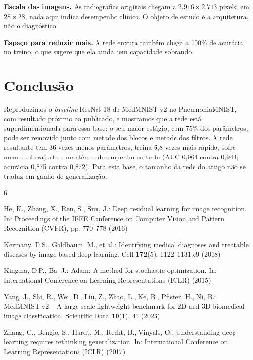 \documentclass[runningheads]{llncs}
\begin{document}
\textbf{Escala das imagens.} As radiografias originais chegam a
$2.916\times2.713$ pixels; em $28\times28$, nada aqui indica desempenho
clínico. O objeto de estudo é a arquitetura, não o diagnóstico.

\textbf{Espaço para reduzir mais.} A rede enxuta também chega a 100\% de
acurácia no treino, o que sugere que ela ainda tem capacidade sobrando.

\section{Conclusão}

Reproduzimos o \textit{baseline} ResNet-18 do MedMNIST v2 no
PneumoniaMNIST, com resultado próximo ao publicado, e mostramos que a rede
está superdimensionada para essa base: o seu maior estágio, com 75\% dos
parâmetros, pode ser removido junto com metade dos blocos e metade dos
filtros. A rede resultante tem 36 vezes menos parâmetros, treina 6,8 vezes
mais rápido, sofre menos sobreajuste e mantém o desempenho no teste
(AUC 0,964 contra 0,949; acurácia 0,875 contra 0,872). Para esta base, o
tamanho da rede do artigo não se traduz em ganho de generalização.

\begin{thebibliography}{6}

He, K., Zhang, X., Ren, S., Sun, J.: Deep residual learning for image
recognition. In: Proceedings of the IEEE Conference on Computer Vision
and Pattern Recognition (CVPR), pp. 770--778 (2016)

Kermany, D.S., Goldbaum, M., et al.: Identifying medical diagnoses and
treatable diseases by image-based deep learning. Cell \textbf{172}(5),
1122--1131.e9 (2018)

Kingma, D.P., Ba, J.: Adam: A method for stochastic optimization. In:
International Conference on Learning Representations (ICLR) (2015)

Yang, J., Shi, R., Wei, D., Liu, Z., Zhao, L., Ke, B., Pfister, H.,
Ni, B.: MedMNIST v2 -- A large-scale lightweight benchmark for 2D and 3D
biomedical image classification. Scientific Data \textbf{10}(1), 41
(2023)

Zhang, C., Bengio, S., Hardt, M., Recht, B., Vinyals, O.: Understanding
deep learning requires rethinking generalization. In: International
Conference on Learning Representations (ICLR) (2017)

\end{thebibliography}
\end{document}
